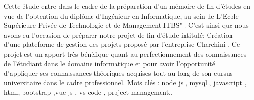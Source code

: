 Cette \'{e}tude entre dans le cadre de la pr\'{e}paration d'un m\'{e}moire de fin d'\'{e}tudes en vue de
l'obtention du dipl\^{o}me d'Ing\'{e}nieur en Informatique, au sein de L'Ecole Sup\'{e}rieure Priv\'{e}e de
Technologie et de Management \guillemotleft{} ITBS" . C'est ainsi que nous avons eu l'occasion de pr\'{e}parer notre
projet de fin d'\'{e}tude intitul\'{e}: \guillemotleft{} Cr\'{e}ation d'une plateforme de gestion des projets \guillemotright{} propos\'{e} par
l'entreprise \guillemotleft{} Cherchini \guillemotright{}.
Ce projet est un apport tr\`{e}s b\'{e}n\'{e}fique quant au perfectionnement des connaissances
de l'\'{e}tudiant dans le domaine informatique et pour avoir l'opportunit\'{e} d'appliquer ses
connaissances th\'{e}oriques acquises tout au long de son cursus universitaire dans le cadre
professionnel.
Mots cl\'{e}s : node js , mysql , javascript , html, bootstrap ,vue js , vs code , project management..


